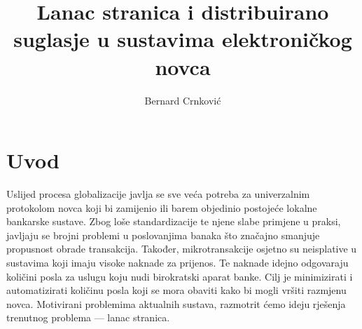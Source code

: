 \documentclass[utf8, zavrsni]{fer}
\begin{document}

\title{Lanac stranica i distribuirano suglasje u sustavima elektroničkog novca}

\author{Bernard Crnković}

\maketitle


\zahvala{}

\tableofcontents

\chapter{Uvod}
Uslijed procesa globalizacije javlja se sve veća potreba za univerzalnim protokolom novca koji bi zamijenio ili barem objedinio postojeće lokalne bankarske sustave. Zbog loše standardizacije te njene slabe primjene u praksi, javljaju se brojni problemi u poslovanjima banaka što značajno smanjuje propusnost obrade transakcija. Također, mikrotransakcije osjetno su neisplative u sustavima koji imaju visoke naknade za prijenos. Te naknade idejno odgovaraju količini posla za uslugu koju nudi birokratski aparat banke. Cilj je minimizirati i automatizirati količinu posla koji se mora obaviti kako bi mogli vršiti razmjenu novca. Motivirani problemima aktualnih sustava, razmotrit ćemo ideju rješenja trenutnog problema --- lanac stranica.
\end{document}
